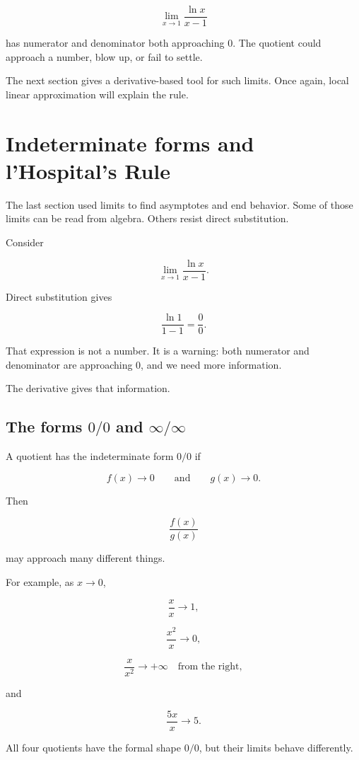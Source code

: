 \[
\lim_{x\to1}\frac{\ln x}{x-1}
\]

has numerator and denominator both approaching \(0\).  The quotient could approach
a number, blow up, or fail to settle.

The next section gives a derivative-based tool for such limits.  Once again, local
linear approximation will explain the rule.

\section{Indeterminate forms and l'Hospital's Rule}
\label{sec:lhospitals-rule}

The last section used limits to find asymptotes and end behavior.  Some of those limits
can be read from algebra.  Others resist direct substitution.

Consider

\[
\lim_{x\to1}\frac{\ln x}{x-1}.
\]

Direct substitution gives

\[
\frac{\ln 1}{1-1}=\frac00.
\]

That expression is not a number.  It is a warning: both numerator and denominator
are approaching \(0\), and we need more information.

The derivative gives that information.

\subsection{The forms \(0/0\) and \(\infty/\infty\)}
\label{subsec:forms-zero-zero-infty-infty}

A quotient has the indeterminate form \(0/0\) if

\[
f(x)\to0
\qquad\text{and}\qquad
g(x)\to0.
\]

Then

\[
\frac{f(x)}{g(x)}
\]

may approach many different things.

For example, as \(x\to0\),

\[
\frac{x}{x}\to1,
\]

\[
\frac{x^2}{x}\to0,
\]

\[
\frac{x}{x^2}\to+\infty \quad \text{from the right},
\]

and

\[
\frac{5x}{x}\to5.
\]

All four quotients have the formal shape \(0/0\), but their limits behave differently.

